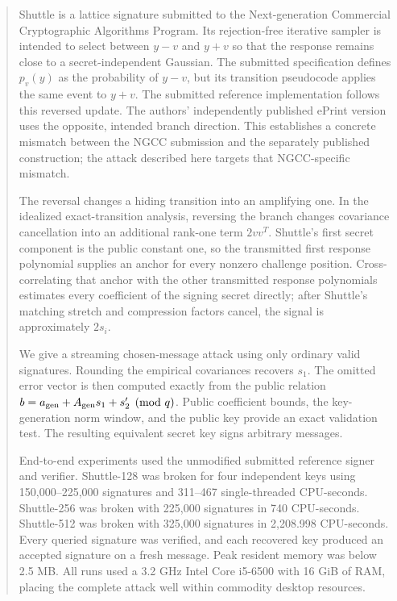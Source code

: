 \documentclass[11pt,a4paper]{article}
\begin{document}
\begin{abstract}
Shuttle is a lattice signature submitted to the Next-generation Commercial
Cryptographic Algorithms Program.  Its rejection-free iterative sampler is
intended to select between $y-v$ and $y+v$ so that the response remains close
to a secret-independent Gaussian.  The submitted specification defines
$p_v(y)$ as the probability of $y-v$, but its transition pseudocode applies
the same event to $y+v$.  The submitted reference implementation follows this
reversed update.  The authors' independently published ePrint version uses
the opposite, intended branch direction.  This establishes a concrete mismatch
between the NGCC submission and the separately published construction; the
attack described here targets that NGCC-specific mismatch.

The reversal changes a hiding transition into an amplifying one.  In the
idealized exact-transition analysis, reversing the branch changes covariance
cancellation into an additional rank-one term $2vv^T$.  Shuttle's first secret component is the
public constant one, so the transmitted first response polynomial supplies an
anchor for every nonzero challenge position.  Cross-correlating that anchor
with the other transmitted response polynomials estimates every coefficient
of the signing secret directly; after Shuttle's matching stretch and
compression factors cancel, the signal is approximately $2s_i$.

We give a streaming chosen-message attack using only ordinary valid
signatures.  Rounding the empirical covariances recovers $s_1$.  The omitted
error vector is then computed exactly from the public relation
$b=a_{\rm gen}+A_{\rm gen}s_1+s'_2\pmod q$.  Public coefficient bounds, the
key-generation norm window, and the public key provide an exact validation
test.  The resulting equivalent secret key signs arbitrary messages.

End-to-end experiments used the unmodified submitted reference signer and
verifier.  Shuttle-128 was broken for four independent keys using
150,000--225,000 signatures and 311--467 single-threaded CPU-seconds.
Shuttle-256 was broken with 225,000 signatures in 740 CPU-seconds.
Shuttle-512 was broken with 325,000 signatures in 2,208.998
CPU-seconds.  Every queried signature was verified, and each recovered key
produced an accepted signature on a fresh message.  Peak resident memory was
below 2.5 MB.  All runs used a 3.2 GHz Intel Core i5-6500 with 16 GiB
of RAM, placing the complete attack well within commodity desktop resources.
\end{abstract}
\end{document}
